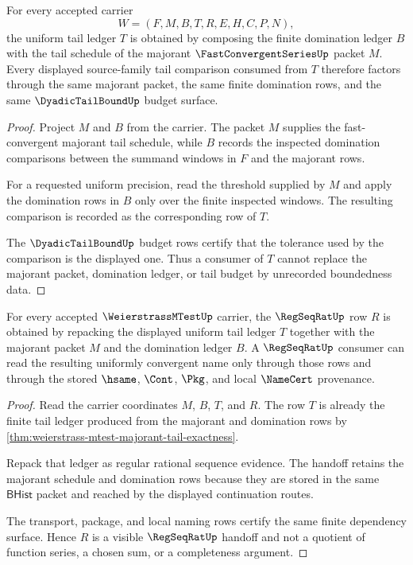 \begin{theorem}
\label{thm:weierstrass-mtest-majorant-tail-exactness}
For every accepted carrier
$$
W=(F,M,B,T,R,E,H,C,P,N),
$$
the uniform tail ledger $T$ is obtained by composing the finite domination ledger $B$ with the tail schedule of the majorant $\FastConvergentSeriesUp$ packet $M$. Every displayed source-family tail comparison consumed from $T$ therefore factors through the same majorant packet, the same finite domination rows, and the same $\DyadicTailBoundUp$ budget surface.
\end{theorem}
\begin{proof}
Project $M$ and $B$ from the carrier. The packet $M$ supplies the fast-convergent majorant tail schedule, while $B$ records the inspected domination comparisons between the summand windows in $F$ and the majorant rows.

For a requested uniform precision, read the threshold supplied by $M$ and apply the domination rows in $B$ only over the finite inspected windows. The resulting comparison is recorded as the corresponding row of $T$.

The $\DyadicTailBoundUp$ budget rows certify that the tolerance used by the comparison is the displayed one. Thus a consumer of $T$ cannot replace the majorant packet, domination ledger, or tail budget by unrecorded boundedness data.
\end{proof}

\begin{theorem}
\label{thm:weierstrass-mtest-regseqrat-handoff}
For every accepted $\WeierstrassMTestUp$ carrier, the $\RegSeqRatUp$ row $R$ is obtained by repacking the displayed uniform tail ledger $T$ together with the majorant packet $M$ and the domination ledger $B$. A $\RegSeqRatUp$ consumer can read the resulting uniformly convergent name only through those rows and through the stored $\hsame$, $\Cont$, $\Pkg$, and local $\NameCert$ provenance.
\end{theorem}
\begin{proof}
Read the carrier coordinates $M$, $B$, $T$, and $R$. The row $T$ is already the finite tail ledger produced from the majorant and domination rows by \autoref{thm:weierstrass-mtest-majorant-tail-exactness}.

Repack that ledger as regular rational sequence evidence. The handoff retains the majorant schedule and domination rows because they are stored in the same $\mathsf{BHist}$ packet and reached by the displayed continuation routes.

The transport, package, and local naming rows certify the same finite dependency surface. Hence $R$ is a visible $\RegSeqRatUp$ handoff and not a quotient of function series, a chosen sum, or a completeness argument.
\end{proof}

